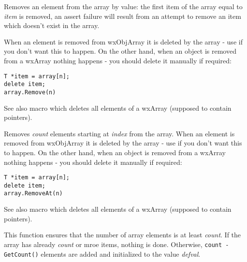 
Removes an element from the array by value: the first item of the
array equal to {\it item} is removed, an assert failure will result from an
attempt to remove an item which doesn't exist in the array.

When an element is removed from wxObjArray it is deleted by the array - use 
 if you don't want this to happen. On the
other hand, when an object is removed from a wxArray nothing happens - you
should delete it manually if required:

\begin{verbatim}
T *item = array[n];
delete item;
array.Remove(n)
\end{verbatim}

See also  macro which deletes all
elements of a wxArray (supposed to contain pointers).

\label{wxarrayremoveat}


Removes {\it count} elements starting at {\it index} from the array. When an
element is removed from wxObjArray it is deleted by the array - use
 if you don't want this to happen. On
the other hand, when an object is removed from a wxArray nothing happens -
you should delete it manually if required:

\begin{verbatim}
T *item = array[n];
delete item;
array.RemoveAt(n)
\end{verbatim}

See also  macro which deletes all
elements of a wxArray (supposed to contain pointers).

\label{wxarraysetcount}


This function ensures that the number of array elements is at least 
{\it count}. If the array has already {\it count} or mroe items, nothing is
done. Otherwise, {\tt count - GetCount()} elements are added and initialized to
the value {\it defval}.



